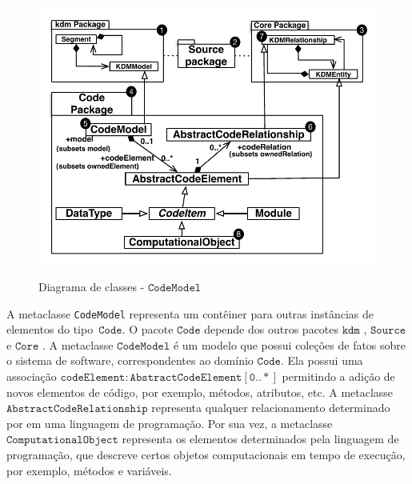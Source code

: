 \begin{figure}[!ht]
	\centering
	\caption{Diagrama de classes - $\mathtt{CodeModel}$}
	\includegraphics[scale=0.67]{images/codeModel}
	\label{fig:CodeModel}
\end{figure}

A metaclasse \texttt{CodeModel} representa um contêiner para outras instâncias de elementos do tipo~$\mathtt{Code}$. O pacote $\mathtt{Code}$  depende dos outros pacotes $\mathtt{kdm}$ , $\mathtt{Source}$  e $\mathtt{Core}$ . A metaclasse $\mathtt{CodeModel}$  é um modelo que possui coleções de fatos sobre o sistema de software, correspondentes ao domínio $\mathtt{Code}$. Ela possui uma associação  $\mathtt{codeElement:AbstractCodeElement[0..*]}$ permitindo a adição de novos elementos de código, por exemplo, métodos, atributos, etc. A metaclasse  $\mathtt{AbstractCodeRelationship}$  representa qualquer relacionamento determinado por em uma linguagem de programação. Por sua vez, a metaclasse $\mathtt{ComputationalObject}$ representa os elementos determinados pela linguagem de programação, que descreve certos objetos computacionais em tempo de execução, por exemplo, métodos e variáveis.

